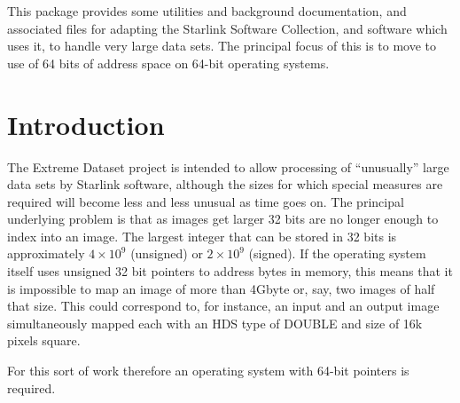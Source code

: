\documentclass[twoside,11pt]{article}
\newcommand{\stardocinitials}  {SSN}
\newcommand{\stardocnumber}    {73.1}
\newcommand{\stardocabstract}  {
This package provides some utilities and background documentation,
and associated files
for adapting the Starlink Software Collection, and software which uses it, 
to handle very large data sets.
The principal focus of this is to move to use of 64 bits of address
space on 64-bit operating systems.
}
\newcommand{\stardocname}{\stardocinitials /\stardocnumber}
\newcommand{\htmlref}[2]{#1}
\newenvironment{latexonly}{}{}
\renewcommand{\_}{\texttt{\symbol{95}}}
\renewcommand{\thepage}{\roman{page}}
\begin{document}
\stardocabstract
  \newpage
  \begin{latexonly}
    \setlength{\parskip}{0mm}
    \tableofcontents
    \setlength{\parskip}{\medskipamount}
    \markboth{\stardocname}{\stardocname}
  \end{latexonly}
\cleardoublepage
\renewcommand{\thepage}{\arabic{page}}
\setcounter{page}{1}





\newcommand{\xroutine}[1]{\htmlref{{\tt #1}}{#1}}
\newcommand{\file}[1]{{\tt #1}}
\newcommand{\routine}[1]{{\tt #1}}
\newcommand{\cc}[1]{{\tt #1}}
\newenvironment{squote}{\begin{quote}\begin{small}}{\end{small}\end{quote}}

\section{Introduction}

The Extreme Dataset project is intended to allow processing of ``unusually''
large data sets by Starlink software, 
although the sizes for which special measures
are required will become less and less unusual as time goes on.
The principal underlying problem is that as images get larger
32 bits are no longer enough to index into an image.
The largest integer that can be stored in 32 bits 
is approximately $4 \times 10^9$ (unsigned) or $2 \times 10^9$ (signed).
If the operating system itself uses unsigned 32 bit pointers to 
address bytes
in memory, this means that it is impossible to map an image of more
than 4Gbyte or, say, two images of half that size. 
This could correspond to, for instance, an input and an output image
simultaneously mapped each with an HDS type of \_DOUBLE and 
size of 16k pixels square.

For this sort of work therefore an operating system with 64-bit 
pointers is required.
\end{document}

